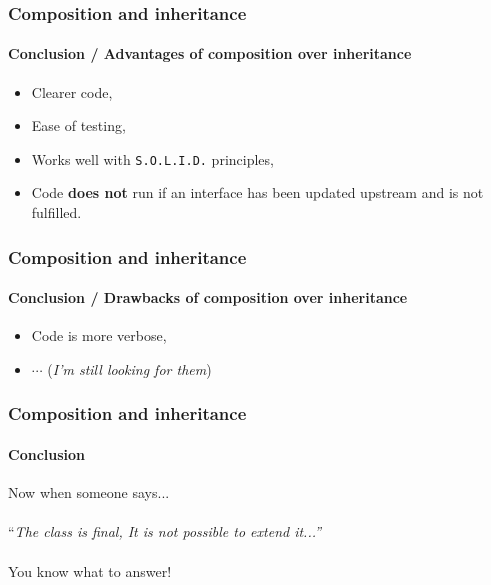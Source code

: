 \begin{frame}
    \frametitle{Composition and inheritance}
    \framesubtitle{Conclusion / Advantages of composition over inheritance}

    \begin{itemize}[<+->]
        \item Clearer code,
        \item Ease of testing,
        \item Works well with \texttt{S.O.L.I.D.} principles,
        \item Code \textbf{does not} run if an interface has been updated upstream and is not fulfilled.
    \end{itemize}
\end{frame}

\begin{frame}
    \frametitle{Composition and inheritance}
    \framesubtitle{Conclusion / Drawbacks of composition over inheritance}

    \begin{itemize}[<+->]
        \item Code is more verbose,
        \item $\cdots$ (\textit{I'm still looking for them})
    \end{itemize}
\end{frame}

\begin{frame}
    \frametitle{Composition and inheritance}
    \framesubtitle{Conclusion}

    Now when someone says...\\~\\\pause
    ``\textit{The class is final, It is not possible to extend it...''}\\~\\\pause
    You know what to answer!
\end{frame}
